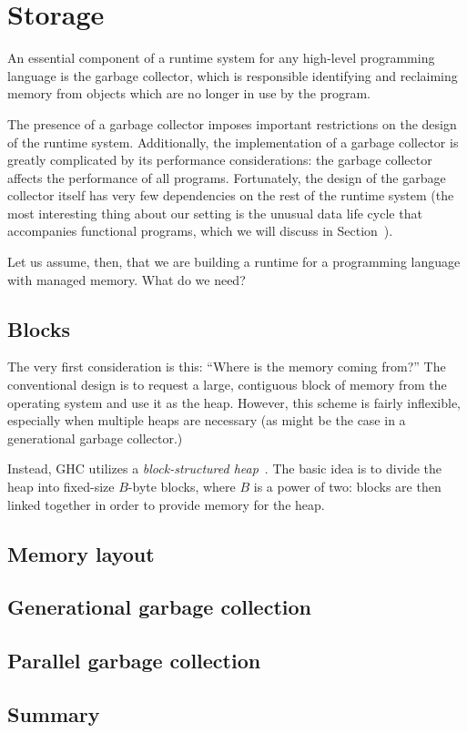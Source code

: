 \section{Storage}

An essential component of a runtime system for any high-level
programming language is the garbage collector, which is responsible
identifying and reclaiming memory from objects which are no longer in
use by the program.

The presence of a garbage collector imposes important restrictions on
the design of the runtime system.  Additionally, the implementation of a
garbage collector is greatly complicated by its performance
considerations: the garbage collector affects the performance of all
programs.  Fortunately, the design of the garbage collector itself has
very few dependencies on the rest of the runtime system (the most
interesting thing about our setting is the unusual data life cycle that
accompanies functional programs, which we will discuss in Section~\XXX).

Let us assume, then, that we are building a runtime for a programming
language with managed memory.  What do we need?

\subsection{Blocks}

The very first consideration is this: ``Where is the memory coming
from?''  The conventional design is to request a large, contiguous block
of memory from the operating system and use it as the heap.  However,
this scheme is fairly inflexible, especially when multiple heaps are
necessary (as might be the case in a generational garbage collector.)

Instead, GHC utilizes a \emph{block-structured heap}~\cite{Marlow:2008:PGG:1375634.1375637}.
The basic idea is to divide the heap into fixed-size $B$-byte blocks, where $B$ is a power of two:
blocks are then linked together in order to provide memory for the heap.

\subsection{Memory layout}

\subsection{Generational garbage collection}

\subsection{Parallel garbage collection}

\subsection{Summary}
